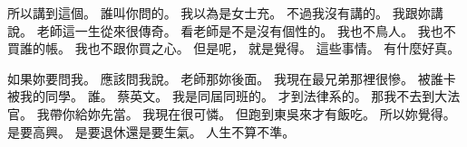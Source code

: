 \hypertarget{c01:cue:3418}{}所以講到這個。
\hypertarget{c01:cue:3419}{}誰叫你問的。
\hypertarget{c01:cue:3420}{}我以為是女士充。
\hypertarget{c01:cue:3421}{}不過我沒有講的。
\hypertarget{c01:cue:3422}{}我跟妳講說。
\hypertarget{c01:cue:3423}{}老師這一生從來很傳奇。
\hypertarget{c01:cue:3424}{}看老師是不是沒有個性的。
\hypertarget{c01:cue:3425}{}我也不鳥人。
\hypertarget{c01:cue:3426}{}我也不買誰的帳。
\hypertarget{c01:cue:3427}{}我也不跟你買之心。
\hypertarget{c01:cue:3428}{}但是呢，
\hypertarget{c01:cue:3429}{}就是覺得。
\hypertarget{c01:cue:3430}{}這些事情。
\hypertarget{c01:cue:3431}{}有什麼好真。

\hypertarget{c01:cue:3432}{}如果妳要問我。
\hypertarget{c01:cue:3433}{}應該問我說。
\hypertarget{c01:cue:3434}{}老師那妳後面。
\hypertarget{c01:cue:3435}{}我現在最兄弟那裡很慘。
\hypertarget{c01:cue:3436}{}被誰卡被我的同學。
\hypertarget{c01:cue:3437}{}誰。
\hypertarget{c01:cue:3438}{}蔡英文。
\hypertarget{c01:cue:3439}{}我是同屆同班的。
\hypertarget{c01:cue:3440}{}才到法律系的。
\hypertarget{c01:cue:3441}{}那我不去到大法官。
\hypertarget{c01:cue:3442}{}我帶你給妳先當。
\hypertarget{c01:cue:3443}{}我現在很可憐。
\hypertarget{c01:cue:3444}{}但跑到東吳來才有飯吃。
\hypertarget{c01:cue:3445}{}所以妳覺得。
\hypertarget{c01:cue:3446}{}是要高興。
\hypertarget{c01:cue:3447}{}是要退休還是要生氣。
\hypertarget{c01:cue:3448}{}人生不算不準。


